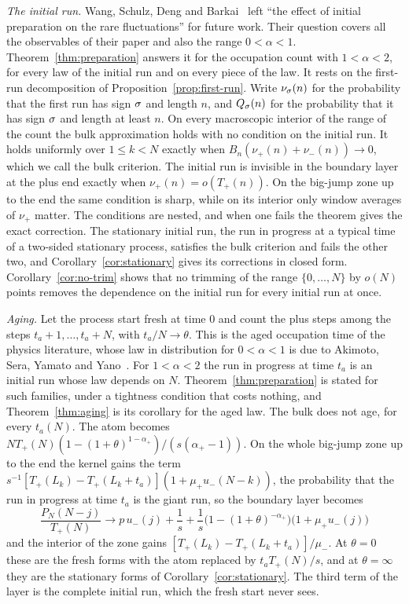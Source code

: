 \emph{The initial run.} Wang, Schulz, Deng and Barkai~\cite{wsdb2018} left ``the effect of
initial preparation on the rare fluctuations'' for future work. Their question covers all
the observables of their paper and also the range $0<\alpha<1$. Theorem~\ref{thm:preparation}
answers it for the occupation count with $1<\alpha<2$, for every law of the initial run and
on every piece of the law. It rests on the first-run decomposition of
Proposition~\ref{prop:first-run}. Write $\nu_\sigma(n)$ for the probability that the first run
has sign $\sigma$ and length $n$, and $Q_\sigma(n)$ for the probability that it has sign $\sigma$ and
length at least $n$. On every macroscopic interior of the range of the count the bulk
approximation holds with no condition on the initial run. It holds uniformly over
$1\le k<N$ exactly when $B_n(\nu_\plus(n)+\nu_\minus(n))\to0$, which we call the bulk
criterion. The initial run is invisible in the boundary layer at the plus end exactly when
$\nu_\plus(n)=o(T_\plus(n))$. On the big-jump zone up to the end the same condition is sharp,
while on its interior only window averages of $\nu_\plus$ matter. The conditions are nested,
and when one fails the theorem gives the exact correction. The stationary initial run, the
run in progress at a typical time of a two-sided stationary process, satisfies the bulk
criterion and fails the other two, and Corollary~\ref{cor:stationary} gives its corrections
in closed form. Corollary~\ref{cor:no-trim} shows that no trimming of the range
$\{0,\dots,N\}$ by $o(N)$ points removes the dependence on the initial run for every initial
run at once.

\emph{Aging.} Let the process start fresh at time $0$ and count the plus steps among the
steps $t_a+1,\dots,t_a+N$, with $t_a/N\to\theta$. This is the aged occupation time of the
physics literature, whose law in distribution for $0<\alpha<1$ is due to Akimoto, Sera,
Yamato and Yano~\cite{asyy2020}. For $1<\alpha<2$ the run in progress at time $t_a$ is an
initial run whose law depends on $N$. Theorem~\ref{thm:preparation} is stated for such
families, under a tightness condition that costs nothing, and Theorem~\ref{thm:aging} is its
corollary for the aged law. The bulk does not age, for every $t_a(N)$. The atom becomes
$NT_\plus(N)(1-(1+\theta)^{1-\alpha_\plus})/(s(\alpha_\plus-1))$. On the whole big-jump zone up to
the end the kernel gains the term $s^{-1}[T_\plus(L_k)-T_\plus(L_k+t_a)](1+\mu_\plus u_\minus(N-k))$,
the probability that the run in progress at time $t_a$ is the giant run, so the boundary
layer becomes
\[
 \frac{P_N(N-j)}{T_\plus(N)}\to p\,u_\minus(j)+\frac1s+\frac1s\bigl(1-(1+\theta)^{-\alpha_\plus}\bigr)\bigl(1+\mu_\plus u_\minus(j)\bigr)
\]
and the interior of the zone gains $[T_\plus(L_k)-T_\plus(L_k+t_a)]/\mu_\minus$. At $\theta=0$
these are the fresh forms with the atom replaced by $t_aT_\plus(N)/s$, and at $\theta=\infty$
they are the stationary forms of Corollary~\ref{cor:stationary}. The third term of the layer
is the complete initial run, which the fresh start never sees.

